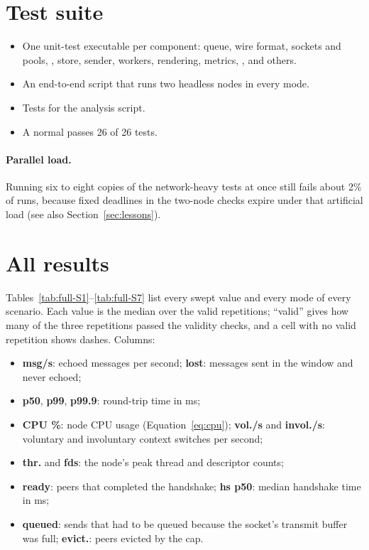 \section{Test suite}

\begin{itemize}
  \item One unit-test executable per component: queue, wire format, sockets and pools,
        , store, sender, workers, rendering, metrics, ,
         and others.
  \item An end-to-end script that runs two headless nodes in every mode.
  \item Tests for the analysis script.
  \item A normal  passes 26 of 26 tests.
\end{itemize}

\paragraph{Parallel load.} Running six to eight copies of the network-heavy tests at
once still fails about 2\% of runs, because fixed deadlines in the two-node checks
expire under that artificial load (see also Section~\ref{sec:lessons}).

\section{All results}
\label{app:full}

Tables~\ref{tab:full-S1}--\ref{tab:full-S7} list every swept value and every mode of
every scenario. Each value is the median over the valid repetitions; ``valid'' gives
how many of the three repetitions passed the validity checks, and a cell with no
valid repetition shows dashes. Columns:
\begin{itemize}
  \item \textbf{msg/s}: echoed messages per second; \textbf{lost}: messages sent in
        the window and never echoed;
  \item \textbf{p50}, \textbf{p99}, \textbf{p99.9}: round-trip time in ms;
  \item \textbf{CPU \%}: node CPU usage (Equation~\ref{eq:cpu}); \textbf{vol./s} and
        \textbf{invol./s}: voluntary and involuntary context switches per second;
  \item \textbf{thr.} and \textbf{fds}: the node's peak thread and descriptor counts;
  \item \textbf{ready}: peers that completed the handshake; \textbf{hs p50}: median
        handshake time in ms;
  \item \textbf{queued}: sends that had to be queued because the socket's transmit
        buffer was full; \textbf{evict.}: peers evicted by the cap.
\end{itemize}

\begin{landscape}
\scriptsize
\setlength{\tabcolsep}{4pt}
\setlength{\LTcapwidth}{\linewidth}









\end{landscape}
